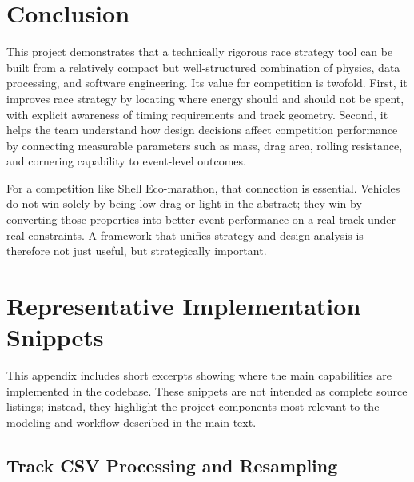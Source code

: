 \documentclass[11pt]{article}
\begin{document}
\section{Conclusion}

This project demonstrates that a technically rigorous race strategy tool can be built from a relatively compact but well-structured combination of physics, data processing, and software engineering. Its value for competition is twofold. First, it improves race strategy by locating where energy should and should not be spent, with explicit awareness of timing requirements and track geometry. Second, it helps the team understand how design decisions affect competition performance by connecting measurable parameters such as mass, drag area, rolling resistance, and cornering capability to event-level outcomes.

For a competition like Shell Eco-marathon, that connection is essential. Vehicles do not win solely by being low-drag or light in the abstract; they win by converting those properties into better event performance on a real track under real constraints. A framework that unifies strategy and design analysis is therefore not just useful, but strategically important.

\appendix

\section{Representative Implementation Snippets}

This appendix includes short excerpts showing where the main capabilities are implemented in the codebase. These snippets are not intended as complete source listings; instead, they highlight the project components most relevant to the modeling and workflow described in the main text.

\subsection{Track CSV Processing and Resampling}
\end{document}
